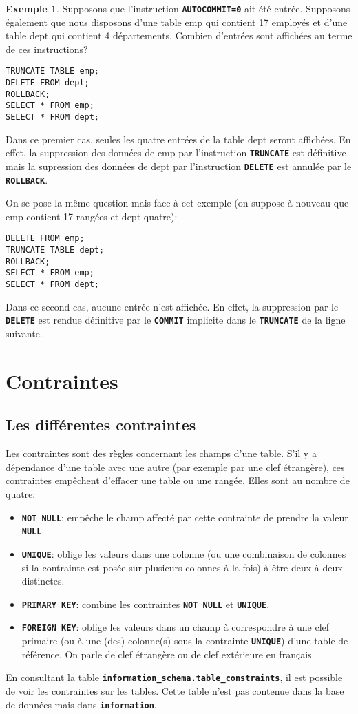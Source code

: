 \documentclass[a4paper, 12pt]{report}
\newcommand{\textSQL}[1]{\texttt{\textbf{#1}}}
\theoremstyle{definition} \newtheorem{ex}{Exemple}
\begin{document}
\begin{ex}
Supposons que l'instruction \textSQL{AUTOCOMMIT=0} ait été entrée. Supposons également que nous disposons d'une table emp qui contient 17 employés et d'une table dept qui contient 4 départements. Combien d'entrées sont affichées au terme de ces instructions?
\begin{lstlisting}[frame=single]
TRUNCATE TABLE emp;
DELETE FROM dept;
ROLLBACK;
SELECT * FROM emp;
SELECT * FROM dept;
\end{lstlisting}
Dans ce premier cas, seules les quatre entrées de la table dept seront affichées. En effet, la suppression des données de emp par l'instruction \textSQL{TRUNCATE} est définitive mais la supression des données de dept par l'instruction \textSQL{DELETE} est annulée par le \textSQL{ROLLBACK}.

On se pose la même question mais face à cet exemple (on suppose à nouveau que emp contient 17 rangées et dept quatre):
\begin{lstlisting}[frame=single]
DELETE FROM emp;
TRUNCATE TABLE dept;
ROLLBACK;
SELECT * FROM emp;
SELECT * FROM dept;
\end{lstlisting}
Dans ce second cas, aucune entrée n'est affichée. En effet, la suppression par le \textSQL{DELETE} est rendue définitive par le \textSQL{COMMIT} implicite dans le \textSQL{TRUNCATE} de la ligne suivante.
\end{ex}
\chapter{Contraintes}

\section{Les différentes contraintes}
Les contraintes sont des règles concernant les champs d'une table. S'il y a dépendance d'une table avec une autre (par exemple par une clef étrangère), ces contraintes empêchent d'effacer une table ou une rangée. Elles sont au nombre de quatre:
\begin{itemize}
  \item \textSQL{NOT NULL}: empêche le champ affecté par cette contrainte de prendre la valeur \textSQL{NULL}.
	\item \textSQL{UNIQUE}: oblige les valeurs dans une colonne (ou une combinaison de colonnes si la contrainte est posée sur plusieurs colonnes à la fois) à être deux-à-deux distinctes.
	\item \textSQL{PRIMARY KEY}: combine les contraintes \textSQL{NOT NULL} et \textSQL{UNIQUE}.
	\item \textSQL{FOREIGN KEY}: oblige les valeurs dans un champ à correspondre à une clef primaire (ou à une (des) colonne(s) sous la contrainte \textSQL{UNIQUE}) d'une table de référence. On parle de clef étrangère ou de clef extérieure en français.
\end{itemize}
En consultant la table  \textSQL{information\_schema.table\_constraints}, il est possible de voir les contraintes sur les tables. Cette table n'est pas contenue dans la base de données mais dans \textSQL{information}.
\end{document}
